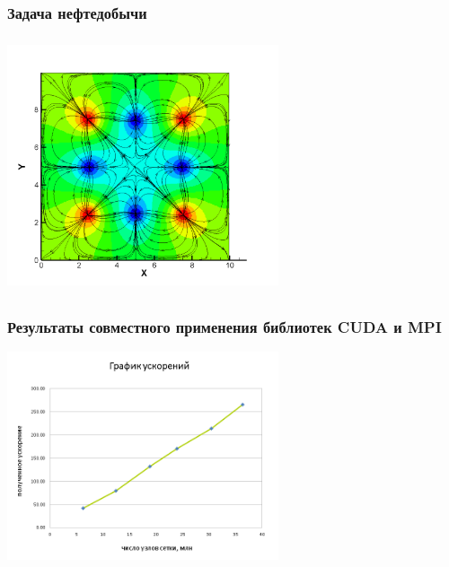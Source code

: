 \documentclass[10pt,pdf,hyperref={unicode}]{beamer} %
\begin{document}
\begin{frame}
\begin{center}
\frametitle{Задача нефтедобычи}
\begin{center}
 \includegraphics[width=8cm,height=7.5cm]{test3}
\end{center}
\end{center}
\end{frame}

\begin{frame}
\begin{center}
\frametitle{Результаты совместного применения библиотек CUDA и MPI}
\includegraphics[width=8cm]{sgpu.png} 
\end{center}
\end{frame}
\end{document}
